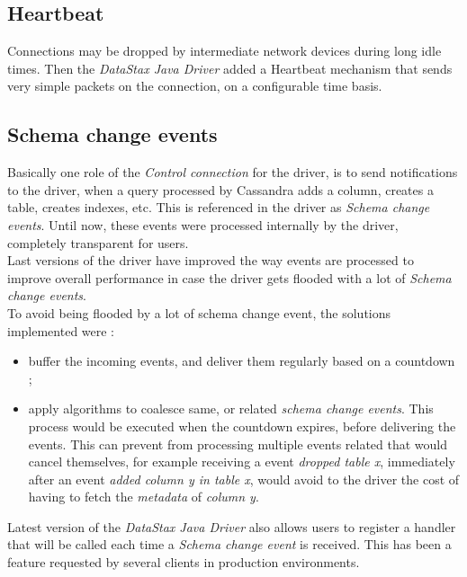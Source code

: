 \documentclass[a4paper]{report}
\newcommand{\djd}{\emph{DataStax Java Driver\xspace}}
\begin{document}
\subsection{Heartbeat}
Connections may be dropped by intermediate network devices during long idle times. Then the \djd{} added a Heartbeat mechanism that sends very simple packets on the connection, on a configurable time basis.

\subsection{Schema change events}
Basically one role of the \emph{Control connection} for the driver, is to send notifications to the driver, when a query processed by Cassandra adds a column, creates a table, creates indexes, etc. This is referenced in the driver as \emph{Schema change events}. Until now, these events were processed internally by the driver, completely transparent for users.\\
Last versions of the driver have improved the way events are processed to improve overall performance in case the driver gets flooded with a lot of \emph{Schema change events}.\\
To avoid being flooded by a lot of schema change event, the solutions implemented were : 
\begin{itemize}
   \item buffer the incoming events, and deliver them regularly based on a countdown ;
   \item apply algorithms to coalesce same, or related \emph{schema change events}. This process would be executed when the countdown expires, before delivering the events. This can prevent from processing multiple events related that would cancel themselves, for example receiving a event \emph{dropped table x}, immediately after an event \emph{added column y in table x}, would avoid to the driver the cost of having to fetch the \emph{metadata} of \emph{column y}.
\end{itemize}
Latest version of the \djd{} also allows users to register a handler that will be called each time a \emph{Schema change event} is received. This has been a feature requested by several clients in production environments.
\end{document}
